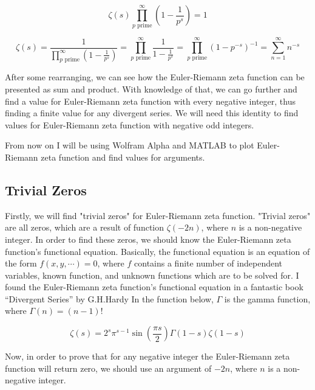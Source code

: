 \documentclass[11pt]{article}
\begin{document}
\begin{equation*}
    \zeta(s)\prod_{p \text{ prime}}^{\infty} (1-\frac{1}{p^s})=1
\end{equation*}

\begin{equation*}
  \zeta(s)=\frac{1}{\prod_{p \text{ prime}}^{\infty} (1-\frac{1}{p^s})}=\prod_{p \text{ prime}}^{\infty} \frac{1}{1-\frac{1}{p^s}}=
  \prod_{p \text{ prime}}^{\infty} (1-p^{-s})^{-1}=\sum_{n=1}^{\infty} n^{-s}
  \end{equation*}

After some rearranging, we can see how the Euler-Riemann zeta function can be
presented as sum and product. With knowledge of that, we can go further and find
a value for Euler-Riemann zeta function with every negative integer, thus
finding a finite value for any divergent series. We will need this identity to
find values for Euler-Riemann zeta function with negative odd integers. 

From now on I will be using Wolfram Alpha and MATLAB to plot Euler-Riemann zeta
function and find values for arguments.

\subsection{Trivial Zeros}
\label{sec:org220a68c}

Firstly, we will find "trivial zeros" for Euler-Riemann zeta function. "Trivial
zeros" are all zeros, which are a result of function \(\zeta(-2n)\), where \(n\) is
a non-negative integer. In order to find these zeros, we should know the
Euler-Riemann zeta function's functional equation. Basically, the functional
equation \cite{Func} is an equation of the form \(f(x, y, \cdots ) = 0\), where \(f\)
contains a finite number of independent variables, known function, and unknown
functions which are to be solved for. I found the Euler-Riemann zeta function's
functional equation in a fantastic book “Divergent Series” by
G.H.Hardy \cite{Hardy} In the function below, \(\Gamma\) is the gamma function,
where \(\Gamma(n) = (n-1)!\) 

\begin{equation}
  \zeta(s)=2^s\pi^{s-1}\sin(\frac{\pi s}{2})\Gamma(1-s)\zeta(1-s)
  \end{equation}

Now, in order to prove that for any negative integer the Euler-Riemann zeta
function will return zero, we should use an argument of \(-2n\), where \(n\) is a
non-negative integer. 
\end{document}
